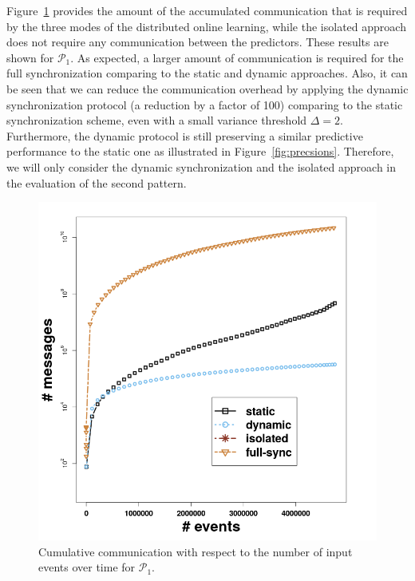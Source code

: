\par Figure~\ref{fig:comm} provides the amount of the accumulated communication that is required by the three modes of the distributed online learning, while the isolated approach does not require any communication between the predictors. These results are shown for $\mathcal{P}_1$.  As expected, a larger amount of communication is required for the full synchronization comparing to the static and dynamic approaches. Also, it can be seen that we can reduce the communication overhead by applying the dynamic synchronization protocol (a reduction by a factor of 100) comparing to the static synchronization scheme, even with a small variance threshold $\Delta=2$. Furthermore, the dynamic  protocol is still preserving a similar predictive performance to the static one as illustrated in Figure~\ref{fig:precsions}.  Therefore, we will only consider the dynamic synchronization and the isolated approach in the evaluation of the second pattern.

\begin{center}
	
	\begin{figure}[H]
		
		\includegraphics[width=\textwidth,height=.62\textheight]{chapters/figures/synopses/p1_messages_100_2_08.png}
		
		\caption{Cumulative communication with respect to the number of input events over time for $\mathcal{P}_1$.}
		\label{fig:comm}
	\end{figure}
\end{center}



